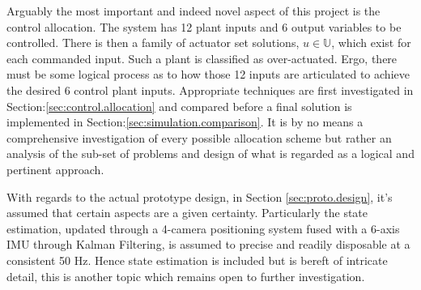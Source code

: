 \par
Arguably the most important and indeed novel aspect of this project is the control allocation. The system has 12 plant inputs and 6 output variables to be controlled. There is then a family of actuator set solutions, $u\in\mathbb{U}$, which exist for each commanded input. Such a plant is classified as over-actuated. Ergo, there must be some logical process as to how those 12 inputs are articulated to achieve the desired 6 control plant inputs. Appropriate techniques are first investigated in Section:\ref{sec:control.allocation} and compared before a final solution is implemented in Section:\ref{sec:simulation.comparison}. It is by no means a comprehensive investigation of every possible allocation scheme but rather an analysis of the sub-set of problems and design of what is regarded as a logical and pertinent approach.
\par
With regards to the actual prototype design, in Section \ref{sec:proto.design}, it's assumed that certain aspects are a given certainty. Particularly the state estimation, updated through a 4-camera positioning system fused with a 6-axis IMU through Kalman Filtering, is assumed to precise and readily disposable at a consistent 50 Hz. Hence state estimation is included but is bereft of intricate detail, this is another topic which remains open to further investigation.
